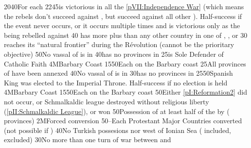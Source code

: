 %
%
{20}{40}{For each }%
%
%
{22}{45}{\FRA is victorious in all the \ref{pVII:Independence War} (which
  means the rebels don't succeed against \FRA, but succeed against all other
  \MAJ). Half-success if the event never occurs, or it occurs multiple times
  and \FRA is victorious only as the \MAJ being rebelled against }%
%
%
{}{40}{ has more \TP plus \COL than any other country in
  one of , , or
  }%
%
%
%
{}{30}{ reaches its ``natural frontier'' during the
  Révolution (cannot be the prioritary objective)}%
%
 
%
%
{}{50}{No vassal of \paysmajeurFrance is in \regionItalie}%
%
%
{}{40}{\paysmajeurFrance has no provinces in \regionItalie}%
%
%
{}{25}{\HIS is Sole Defender of Catholic Faith}%
%
\EUobjective4M{Barbary Coast}{\Presidio}%
{15}{50}{Each \Presidio on the Barbary coast}%
%
%
{}{25}{All provinces of \paysprovincesne have been annexed}%
%
%
%
{}{40}{No vassal of \paysmajeurFrance is in \regionItalie}%
%
%
{}{30}{\paysmajeurFrance has no provinces in \regionItalie}%
%
%
{25}{50}{Spanish King was elected to the Imperial Throne. Half-success if no
  election is held}%
%
\EUobjective4M{Barbary Coast}{\Presidio}%
{15}{50}{Each \Presidio on the Barbary coast}%
%
%
{}{50}{Either \ref{pI:Reformation2} did not occur, or Schmalkaldic league
  destroyed without religious liberty (\ref{pII:Schmalkaldic League}),
  or  won}%
%
%
%
{}{50}{Possession of at least half of the \payshongrie by \AUSaus (
  provinces)}%
%
\EUobjective2M{Forced conversion}{\MAJ}%
{50}{--}{Each Protestant Major Countries converted (not possible if \CATHCO)}%
%
%
{}{40}{No Turkish possesions nor \VASSAL west of Ionian Sea
  ( included, \paystripoli excluded)}%
%
%
{}{30}{No more than one turn of war between  and
  }%
